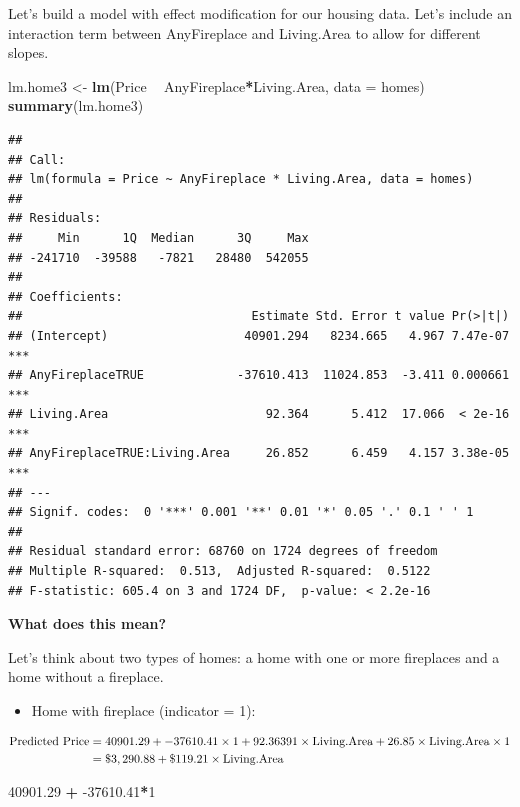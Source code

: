 \documentclass[]{book}
\newenvironment{Shaded}{\begin{snugshade}}{\end{snugshade}}
\newcommand{\DataTypeTok}[1]{\textcolor[rgb]{0.13,0.29,0.53}{#1}}
\newcommand{\DecValTok}[1]{\textcolor[rgb]{0.00,0.00,0.81}{#1}}
\newcommand{\FloatTok}[1]{\textcolor[rgb]{0.00,0.00,0.81}{#1}}
\newcommand{\KeywordTok}[1]{\textcolor[rgb]{0.13,0.29,0.53}{\textbf{#1}}}
\newcommand{\NormalTok}[1]{#1}
\newcommand{\OperatorTok}[1]{\textcolor[rgb]{0.81,0.36,0.00}{\textbf{#1}}}
\newcommand{\StringTok}[1]{\textcolor[rgb]{0.31,0.60,0.02}{#1}}
\providecommand{\tightlist}{%
  \setlength{\itemsep}{0pt}\setlength{\parskip}{0pt}}
\begin{document}
Let's build a model with effect modification for our housing data. Let's include an interaction term between AnyFireplace and Living.Area to allow for different slopes.

\begin{Shaded}
\begin{Highlighting}[]
\NormalTok{lm.home3 <-}\StringTok{ }\KeywordTok{lm}\NormalTok{(Price }\OperatorTok{~}\StringTok{ }\NormalTok{AnyFireplace}\OperatorTok{*}\NormalTok{Living.Area, }\DataTypeTok{data =}\NormalTok{ homes)}
\KeywordTok{summary}\NormalTok{(lm.home3)}
\end{Highlighting}
\end{Shaded}

\begin{verbatim}
## 
## Call:
## lm(formula = Price ~ AnyFireplace * Living.Area, data = homes)
## 
## Residuals:
##     Min      1Q  Median      3Q     Max 
## -241710  -39588   -7821   28480  542055 
## 
## Coefficients:
##                                Estimate Std. Error t value Pr(>|t|)    
## (Intercept)                   40901.294   8234.665   4.967 7.47e-07 ***
## AnyFireplaceTRUE             -37610.413  11024.853  -3.411 0.000661 ***
## Living.Area                      92.364      5.412  17.066  < 2e-16 ***
## AnyFireplaceTRUE:Living.Area     26.852      6.459   4.157 3.38e-05 ***
## ---
## Signif. codes:  0 '***' 0.001 '**' 0.01 '*' 0.05 '.' 0.1 ' ' 1
## 
## Residual standard error: 68760 on 1724 degrees of freedom
## Multiple R-squared:  0.513,  Adjusted R-squared:  0.5122 
## F-statistic: 605.4 on 3 and 1724 DF,  p-value: < 2.2e-16
\end{verbatim}

\textbf{What does this mean?}

Let's think about two types of homes: a home with one or more fireplaces and a home without a fireplace.

\begin{itemize}
\tightlist
\item
  Home with fireplace (indicator = 1):
\end{itemize}

\[
\begin{align*}
\hbox{Predicted Price} &= 40901.29 + -37610.41 \times 1 + 92.36391 \times \hbox{Living.Area} + 26.85 \times \hbox{Living.Area} \times 1 \\
& = \$3,290.88 + \$119.21 \times \hbox{Living.Area}
\end{align*}
\]

\begin{Shaded}
\begin{Highlighting}[]
\FloatTok{40901.29} \OperatorTok{+}\StringTok{ }\FloatTok{-37610.41}\OperatorTok{*}\DecValTok{1}
\end{Highlighting}
\end{Shaded}
\end{document}
